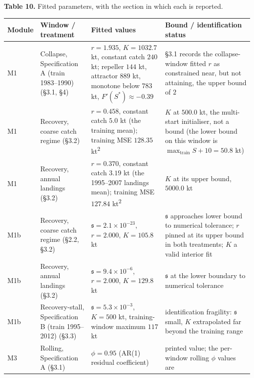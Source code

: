 \documentclass[11pt]{article}
\begin{document}
\textbf{Table 10.} Fitted parameters, with the section in which each is
reported.

\begin{longtable}[]{@{}
  >{\raggedright\arraybackslash}p{}
  >{\raggedright\arraybackslash}p{}
  >{\raggedright\arraybackslash}p{}
  >{\raggedright\arraybackslash}p{}@{}}
\toprule\noalign{}
Module & Window / treatment & Fitted values & Bound / identification status \\
\midrule\noalign{}
\endhead
\bottomrule\noalign{}
\endlastfoot
M1 & Collapse, Specification A (train 1983--1990) (\S{}3.1, \S{}4) &
\(r = 1.935\), \(K = 1032.7\) kt, constant catch \(240\) kt; repeller
\(144\) kt, attractor \(889\) kt, monotone below \(783\) kt,
\(F'(S^*) \approx -0.39\) & \S{}3.1 records the collapse-window fitted
\(r\) as constrained near, but not attaining, the upper bound of \(2\) \\
M1 & Recovery, coarse catch regime (\S{}3.2) & \(r = 0.458\), constant
catch \(5.0\) kt (the training mean); training MSE \(128.35\) kt\textsuperscript{2}
& \(K\) at \(500.0\) kt, the multi-start initialiser, not a bound (the
lower bound on this window is \(\max_{\mathrm{train}}S + 10 =
50.8\) kt) \\
M1 & Recovery, annual landings (\S{}3.2) & \(r = 0.370\), constant catch
\(3.19\) kt (the 1995--2007 landings mean); training MSE \(127.84\)
kt\textsuperscript{2} & \(K\) at its upper bound, \(5000.0\) kt \\
M1b & Recovery, coarse catch regime (\S{}2.2, \S{}3.2) &
\(\mathfrak{s} = 2.1\times10^{-23}\), \(r = 2.000\),
\(K = 105.8\) kt & \(\mathfrak{s}\) approaches lower bound to numerical tolerance; \(r\)
pinned at its upper bound in both treatments; \(K\) a valid interior
fit \\
M1b & Recovery, annual landings (\S{}3.2) &
\(\mathfrak{s} = 9.4\times10^{-6}\), \(r = 2.000\),
\(K = 129.8\) kt & \(\mathfrak{s}\) at the lower boundary to
numerical tolerance \\
M1b & Recovery-stall, Specification B (train 1995--2012) (\S{}3.3) &
\(\mathfrak{s} = 5.3\times10^{-3}\), \(K = 500\) kt, training-window
maximum \(117\) kt & identification fragility: \(\mathfrak{s}\)
small, \(K\) extrapolated far beyond the training range \\
M3 & Rolling, Specification A (\S{}3.1) & \(\phi = 0.95\) (AR(1) residual
coefficient) & printed value; the per-window rolling \(\phi\) values are

\end{longtable}
\end{document}
